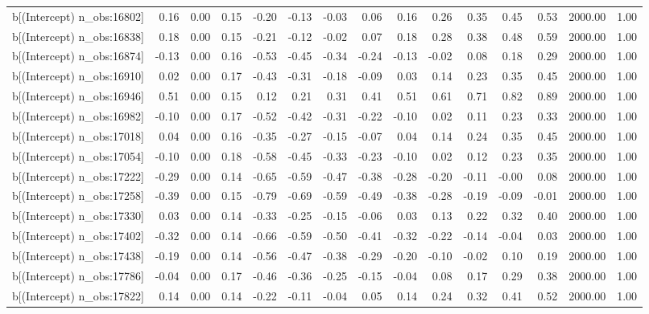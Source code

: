 \begin{table}[ht]
\begin{tabular}{rrrrrrrrrrrrrrr}
  b[(Intercept) n\_obs:16802] & 0.16 & 0.00 & 0.15 & -0.20 & -0.13 & -0.03 & 0.06 & 0.16 & 0.26 & 0.35 & 0.45 & 0.53 & 2000.00 & 1.00 \\ 
  b[(Intercept) n\_obs:16838] & 0.18 & 0.00 & 0.15 & -0.21 & -0.12 & -0.02 & 0.07 & 0.18 & 0.28 & 0.38 & 0.48 & 0.59 & 2000.00 & 1.00 \\ 
  b[(Intercept) n\_obs:16874] & -0.13 & 0.00 & 0.16 & -0.53 & -0.45 & -0.34 & -0.24 & -0.13 & -0.02 & 0.08 & 0.18 & 0.29 & 2000.00 & 1.00 \\ 
  b[(Intercept) n\_obs:16910] & 0.02 & 0.00 & 0.17 & -0.43 & -0.31 & -0.18 & -0.09 & 0.03 & 0.14 & 0.23 & 0.35 & 0.45 & 2000.00 & 1.00 \\ 
  b[(Intercept) n\_obs:16946] & 0.51 & 0.00 & 0.15 & 0.12 & 0.21 & 0.31 & 0.41 & 0.51 & 0.61 & 0.71 & 0.82 & 0.89 & 2000.00 & 1.00 \\ 
  b[(Intercept) n\_obs:16982] & -0.10 & 0.00 & 0.17 & -0.52 & -0.42 & -0.31 & -0.22 & -0.10 & 0.02 & 0.11 & 0.23 & 0.33 & 2000.00 & 1.00 \\ 
  b[(Intercept) n\_obs:17018] & 0.04 & 0.00 & 0.16 & -0.35 & -0.27 & -0.15 & -0.07 & 0.04 & 0.14 & 0.24 & 0.35 & 0.45 & 2000.00 & 1.00 \\ 
  b[(Intercept) n\_obs:17054] & -0.10 & 0.00 & 0.18 & -0.58 & -0.45 & -0.33 & -0.23 & -0.10 & 0.02 & 0.12 & 0.23 & 0.35 & 2000.00 & 1.00 \\ 
  b[(Intercept) n\_obs:17222] & -0.29 & 0.00 & 0.14 & -0.65 & -0.59 & -0.47 & -0.38 & -0.28 & -0.20 & -0.11 & -0.00 & 0.08 & 2000.00 & 1.00 \\ 
  b[(Intercept) n\_obs:17258] & -0.39 & 0.00 & 0.15 & -0.79 & -0.69 & -0.59 & -0.49 & -0.38 & -0.28 & -0.19 & -0.09 & -0.01 & 2000.00 & 1.00 \\ 
  b[(Intercept) n\_obs:17330] & 0.03 & 0.00 & 0.14 & -0.33 & -0.25 & -0.15 & -0.06 & 0.03 & 0.13 & 0.22 & 0.32 & 0.40 & 2000.00 & 1.00 \\ 
  b[(Intercept) n\_obs:17402] & -0.32 & 0.00 & 0.14 & -0.66 & -0.59 & -0.50 & -0.41 & -0.32 & -0.22 & -0.14 & -0.04 & 0.03 & 2000.00 & 1.00 \\ 
  b[(Intercept) n\_obs:17438] & -0.19 & 0.00 & 0.14 & -0.56 & -0.47 & -0.38 & -0.29 & -0.20 & -0.10 & -0.02 & 0.10 & 0.19 & 2000.00 & 1.00 \\ 
  b[(Intercept) n\_obs:17786] & -0.04 & 0.00 & 0.17 & -0.46 & -0.36 & -0.25 & -0.15 & -0.04 & 0.08 & 0.17 & 0.29 & 0.38 & 2000.00 & 1.00 \\ 
  b[(Intercept) n\_obs:17822] & 0.14 & 0.00 & 0.14 & -0.22 & -0.11 & -0.04 & 0.05 & 0.14 & 0.24 & 0.32 & 0.41 & 0.52 & 2000.00 & 1.00 \\ 

\end{tabular}
\end{table}
